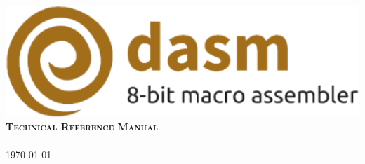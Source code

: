 \begin{titlepage}

\begin{center}


\includegraphics[width=1\textwidth]{dasm-logo.png}\\[6cm]
\textsc{\huge \bf Technical Reference Manual}\\[0.25cm]
\huge{}\\[7cm]

\textsc{\large \today}











\vfill


\end{center}
\end{titlepage}
